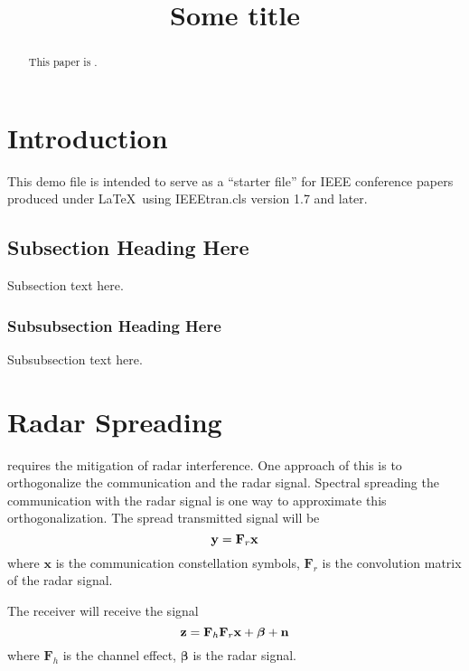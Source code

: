 \documentclass[conference]{IEEEtran}
\begin{document}
\title{Some title}

\author{
}
\maketitle

\begin{abstract}
This paper is .
\end{abstract}

\section{Introduction}
This demo file is intended to serve as a ``starter file''
for IEEE conference papers produced under \LaTeX\ using
IEEEtran.cls version 1.7 and later.

\subsection{Subsection Heading Here}
Subsection text here.


\subsubsection{Subsubsection Heading Here}
Subsubsection text here.


\section{Radar Spreading}
\SSPARC requires the mitigation of radar interference. One approach of this is to orthogonalize the communication and the radar signal.  Spectral spreading the communication with the radar signal is one way to approximate this orthogonalization.  The spread transmitted signal will be
\begin{equation}
\mathbf{y}=\mathbf{F}_r \mathbf{x}\\
\label{eq1}
\end{equation}  
where $\mathbf{x}$ is the communication constellation symbols, $\mathbf{F}_r$ is the convolution matrix of the radar signal.

The receiver will receive the signal
\begin{equation}
\mathbf{z}=\mathbf{F}_h \mathbf{F}_r \mathbf{x} + \boldsymbol{\beta} +\mathbf{n}\\
\label{eq2}
\end{equation} 
where $\mathbf{F}_h$ is the channel effect, $\boldsymbol{\beta}$ is the radar signal.
\end{document}
